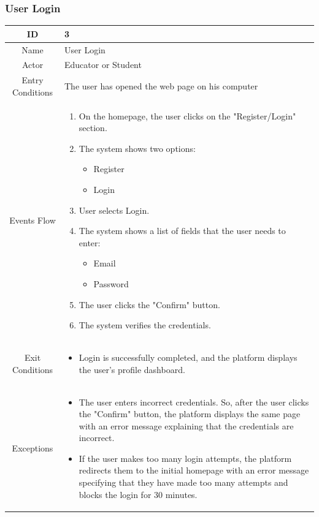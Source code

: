 \subsubsection{User Login}
\begin{longtable}{|c| p{10cm}|}
\hline
ID & 3 \\
\hline
Name & User Login \\
\hline
Actor & Educator or Student \\
\hline
Entry Conditions &
The user has opened the web page on his computer
\\
\hline
Events Flow &
\begin{enumerate}
\item On the homepage, the user clicks on the "Register/Login" section.
\item The system shows two options:
\begin{itemize}
\item Register
\item Login
\end{itemize}
\item User selects Login.
\item The system shows a list of fields that the user needs to enter:
\begin{itemize}
\item Email
\item Password
\end{itemize}
\item The user clicks the "Confirm" button.
\item The system verifies the credentials.
\end{enumerate} \\
\hline
Exit Conditions &
\begin{itemize}
\item Login is successfully completed, and the platform displays the user's profile dashboard.
\end{itemize}\\
\hline
Exceptions &
\begin{itemize}
\item The user enters incorrect credentials. So, after the user clicks the "Confirm" button, the platform displays the same page with an error message explaining that the credentials are incorrect.
\item If the user makes too many login attempts, the platform redirects them to the initial homepage with an error message specifying that they have made too many attempts and blocks the login for 30 minutes.
\end{itemize} \\
\hline
\end{longtable}

